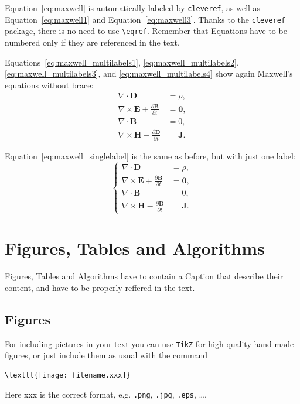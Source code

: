 \documentclass{Configuration_Files/PoliMi3i_thesis}
\begin{document}
Equation~\eqref{eq:maxwell} is automatically labeled by \texttt{cleveref},
as well as Equation~\eqref{eq:maxwell1} and Equation~\eqref{eq:maxwell3}.
Thanks to the \verb|cleveref| package, there is no need to use \verb|\eqref|.
Remember that Equations have to be numbered only if they are referenced in the text.

Equations~\eqref{eq:maxwell_multilabels1}, \eqref{eq:maxwell_multilabels2}, \eqref{eq:maxwell_multilabels3}, and \eqref{eq:maxwell_multilabels4} show again Maxwell's equations without brace:
\begin{align}
    \nabla\cdot \bm{D} & = \rho, \label{eq:maxwell_multilabels1} \\
    \nabla \times \bm{E} +  \frac{\partial \bm{B}}{\partial t} &= \bm{0}, \label{eq:maxwell_multilabels2} \\
    \nabla\cdot \bm{B} & = 0, \label{eq:maxwell_multilabels3} \\
    \nabla \times \bm{H} - \frac{\partial \bm{D}}{\partial t} &= \bm{J} \label{eq:maxwell_multilabels4}.
\end{align}

Equation~\eqref{eq:maxwell_singlelabel} is the same as before,
but with just one label:
\begin{equation}
    \label{eq:maxwell_singlelabel}
    \left\{
    \begin{aligned}
    \nabla\cdot \bm{D} & = \rho, \\
    \nabla \times \bm{E} +  \frac{\partial \bm{B}}{\partial t} &= \bm{0},\\
    \nabla\cdot \bm{B} & = 0, \\
    \nabla \times \bm{H} - \frac{\partial \bm{D}}{\partial t} &= \bm{J}.
    \end{aligned}
    \right.
\end{equation}

\section{Figures, Tables and Algorithms}
Figures, Tables and Algorithms have to contain a Caption that describe their content, and have to be properly reffered in the text.

\subsection{Figures}
\label{subsec:figures}

For including pictures in your text you can use \texttt{TikZ} for high-quality hand-made figures,
or just include them as usual with the command
\begin{verbatim}
\texttt{[image: filename.xxx]}
\end{verbatim}
Here xxx is the correct format, e.g. \verb|.png|, \verb|.jpg|, \verb|.eps|, \dots.
\end{document}
